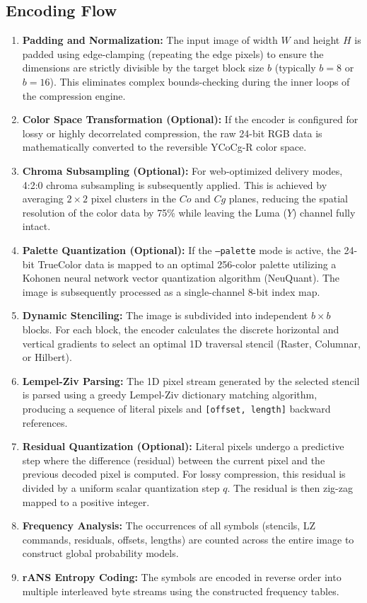 \subsection{Encoding Flow}
\begin{enumerate}
    \item \textbf{Padding and Normalization:} The input image of width $W$ and height $H$ is padded using edge-clamping (repeating the edge pixels) to ensure the dimensions are strictly divisible by the target block size $b$ (typically $b=8$ or $b=16$). This eliminates complex bounds-checking during the inner loops of the compression engine.
    \item \textbf{Color Space Transformation (Optional):} If the encoder is configured for lossy or highly decorrelated compression, the raw 24-bit RGB data is mathematically converted to the reversible YCoCg-R color space.
    \item \textbf{Chroma Subsampling (Optional):} For web-optimized delivery modes, 4:2:0 chroma subsampling is subsequently applied. This is achieved by averaging $2 \times 2$ pixel clusters in the $Co$ and $Cg$ planes, reducing the spatial resolution of the color data by 75\% while leaving the Luma ($Y$) channel fully intact.
    \item \textbf{Palette Quantization (Optional):} If the \texttt{--palette} mode is active, the 24-bit TrueColor data is mapped to an optimal 256-color palette utilizing a Kohonen neural network vector quantization algorithm (NeuQuant). The image is subsequently processed as a single-channel 8-bit index map.
    \item \textbf{Dynamic Stenciling:} The image is subdivided into independent $b \times b$ blocks. For each block, the encoder calculates the discrete horizontal and vertical gradients to select an optimal 1D traversal stencil (Raster, Columnar, or Hilbert).
    \item \textbf{Lempel-Ziv Parsing:} The 1D pixel stream generated by the selected stencil is parsed using a greedy Lempel-Ziv dictionary matching algorithm, producing a sequence of literal pixels and \texttt{[offset, length]} backward references.
    \item \textbf{Residual Quantization (Optional):} Literal pixels undergo a predictive step where the difference (residual) between the current pixel and the previous decoded pixel is computed. For lossy compression, this residual is divided by a uniform scalar quantization step $q$. The residual is then zig-zag mapped to a positive integer.
    \item \textbf{Frequency Analysis:} The occurrences of all symbols (stencils, LZ commands, residuals, offsets, lengths) are counted across the entire image to construct global probability models.
    \item \textbf{rANS Entropy Coding:} The symbols are encoded in reverse order into multiple interleaved byte streams using the constructed frequency tables.
\end{enumerate}

